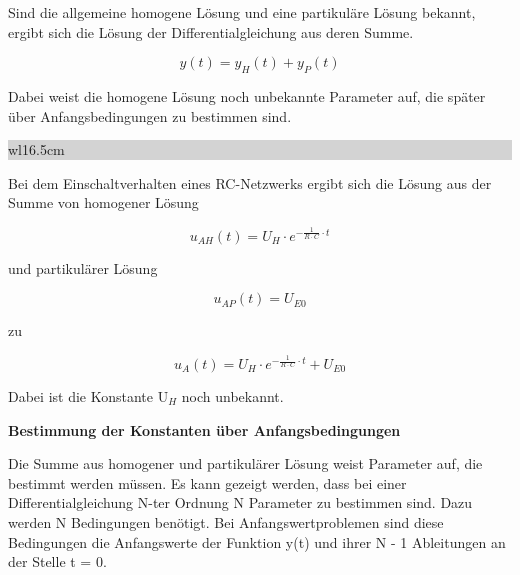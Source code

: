 \noindent Sind die allgemeine homogene Lösung und eine partikuläre Lösung bekannt, ergibt sich die Lösung der Differentialgleichung aus deren Summe.

\begin{equation}\label{eq:seventynine}
y\left(t\right)=y_{H} \left(t\right)+y_{P} \left(t\right)
\end{equation}

\noindent Dabei weist die homogene Lösung noch unbekannte Parameter auf, die später über Anfangsbedingungen
zu bestimmen sind.\bigskip

\noindent
\colorbox{lightgray}{%
%
\renewcommand\arraystretch{0.6}%
\begin{tabular}{ wl{16.5cm} }
{\selectfont{
Beispiel: Einschwingverhalten eines RC-Netzwerks}}
\end{tabular}%
}\bigskip

\noindent Bei dem Einschaltverhalten eines RC-Netzwerks ergibt sich die Lösung aus der Summe von homogener Lösung

\begin{equation}\label{eq:eighty}
u_{AH} \left(t\right)=U_{H} \cdot e^{-\frac{1}{R\cdot C} \cdot t}
\end{equation}

\noindent und partikulärer Lösung

\begin{equation}\label{eq:eightyone}
u_{AP} \left(t\right)=U_{E0} 
\end{equation}

\noindent zu

\begin{equation}\label{eq:eightytwo}
u_{A} \left(t\right)=U_{H} \cdot e^{-\frac{1}{R\cdot C} \cdot t} +U_{E0}
\end{equation}

\noindent Dabei ist die Konstante U$_{H}$ noch unbekannt.\bigskip

{\selectfont
\noindent\textbf{Bestimmung der Konstanten über Anfangsbedingungen}}\smallskip

\noindent Die Summe aus homogener und partikulärer Lösung weist Parameter auf, die bestimmt werden müssen. Es kann gezeigt werden, dass bei einer Differentialgleichung N-ter Ordnung N Parameter zu bestimmen sind. Dazu werden N Bedingungen benötigt. Bei Anfangswertproblemen sind diese Bedingungen
die Anfangswerte der Funktion y(t) und ihrer N - 1 Ableitungen an der Stelle t = 0.\bigskip

